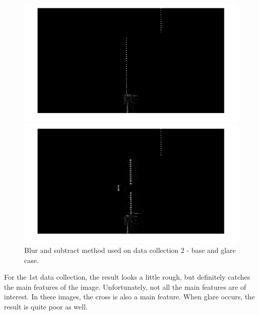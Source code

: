 \begin{figure}[h]	
	\begin{minipage}[t]{0.48\textwidth}
		\hspace{-0.75cm}
		\includegraphics[width=1.2\textwidth]{figures/ImageAnalysis/blur_subtract/blur_base2.png}
	\end{minipage}
	\hspace{0.02\textwidth}
	\begin{minipage}[t]{0.48\textwidth}
		\hspace{-0.75cm}	
		\includegraphics[width=1.2\textwidth]{figures/ImageAnalysis/blur_subtract/blur_glare2.png}
	\end{minipage}
	\caption{Blur and subtract method used on data collection 2 - base and glare case.}
	\label{fig:blur_subtract_2}
\end{figure}
\FloatBarrier
For the 1st data collection, the result looks a little rough, but definitely catches the main features of the image. Unfortunately, not all the main features are of interest. In these images, the cross is also a main feature. When glare occurs, the result is quite poor as well. \\

